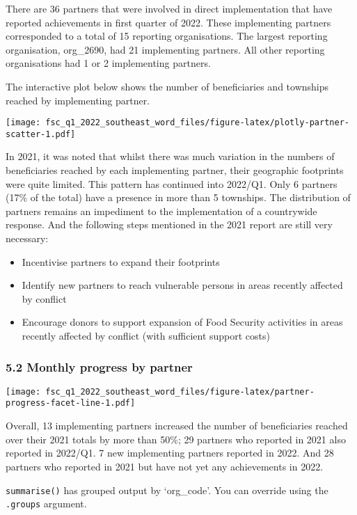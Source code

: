 \documentclass[
]{article}
\begin{document}
There are 36 partners that were involved in direct implementation that
have reported achievements in first quarter of 2022. These implementing
partners corresponded to a total of 15 reporting organisations. The
largest reporting organisation, org\_2690, had 21 implementing partners.
All other reporting organisations had 1 or 2 implementing partners.

The interactive plot below shows the number of beneficiaries and
townships reached by implementing partner.

\texttt{[image: fsc\_q1\_2022\_southeast\_word\_files/figure-latex/plotly-partner-scatter-1.pdf]}

In 2021, it was noted that whilst there was much variation in the
numbers of beneficiaries reached by each implementing partner, their
geographic footprints were quite limited. This pattern has continued
into 2022/Q1. Only 6 partners (17\% of the total) have a presence in
more than 5 townships. The distribution of partners remains an
impediment to the implementation of a countrywide response. And the
following steps mentioned in the 2021 report are still very necessary:

\begin{itemize}
\item
  Incentivise partners to expand their footprints
\item
  Identify new partners to reach vulnerable persons in areas recently
  affected by conflict
\item
  Encourage donors to support expansion of Food Security activities in
  areas recently affected by conflict (with sufficient support costs)
\end{itemize}

\hypertarget{monthly-progress-by-partner}{%
\subsubsection{5.2 Monthly progress by
partner}\label{monthly-progress-by-partner}}

\texttt{[image: fsc\_q1\_2022\_southeast\_word\_files/figure-latex/partner-progress-facet-line-1.pdf]}

Overall, 13 implementing partners increased the number of beneficiaries
reached over their 2021 totals by more than 50\%; 29 partners who
reported in 2021 also reported in 2022/Q1. 7 new implementing partners
reported in 2022. And 28 partners who reported in 2021 but have not yet
any achievements in 2022.

\texttt{summarise()} has grouped output by `org\_code'. You can override
using the \texttt{.groups} argument.
\end{document}
